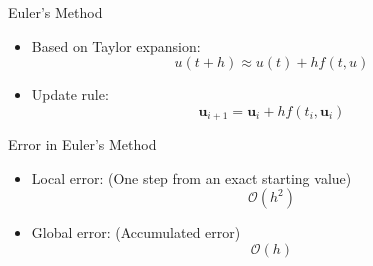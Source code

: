 \documentclass[10pt]{beamer}
\begin{document}
\begin{frame}{Euler's Method}

\begin{itemize}
\item Based on Taylor expansion:
\[
u(t+h) \approx u(t) + h f(t,u)
\]
\item Update rule:
\[
\textbf{u}_{i+1} = \textbf{u}_i + h f(t_i, \textbf{u}_i)
\]
\end{itemize}


\end{frame}

\begin{frame}{Error in Euler's Method}

\begin{itemize}
\item Local error: (One step from an exact starting value)
\[
\mathcal{O}(h^2)
\]
\item Global error: (Accumulated error)
\[
\mathcal{O}(h)
\]
\end{itemize}

\vspace{3mm}


\end{frame}
\end{document}
